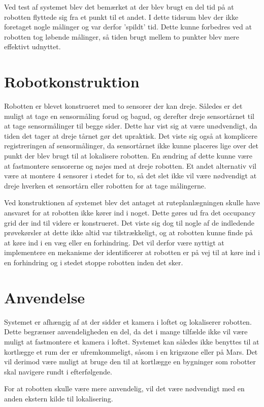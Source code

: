 Ved test af systemet blev det bemærket at der blev brugt en del tid på at robotten flyttede sig fra et punkt til et andet.
I dette tidsrum blev der ikke foretaget nogle målinger og var derfor 'spildt' tid. 
Dette kunne forbedres ved at robotten tog løbende målinger, så tiden brugt mellem to punkter blev mere effektivt udnyttet.

\section{Robotkonstruktion}
Robotten er blevet konstrueret med to sensorer der kan dreje. 
Således er det muligt at tage en sensormåling forud og bagud, og derefter dreje sensortårnet til at tage sensormålinger til begge sider.
Dette har vist sig at være unødvendigt, da tiden det tager at dreje tårnet gør det upraktisk.
Det viste sig også at komplicere registreringen af sensormålinger, da sensortårnet ikke kunne placeres lige over det punkt der blev brugt til at lokalisere robotten.
En ændring af dette kunne være at fastmontere sensorerne og nøjes med at dreje robotten.
Et andet alternativ vil være at montere 4 sensorer i stedet for to, så det slet ikke vil være nødvendigt at dreje hverken et sensortårn eller robotten for at tage målingerne.

Ved konstruktionen af systemet blev det antaget at ruteplanlægningen skulle have ansvaret for at robotten ikke kører ind i noget. 
Dette gøres ud fra det occupancy grid der ind til videre er konstrueret.
Det viste sig dog til nogle af de indledende prøvekørsler at dette ikke altid var tilstrækkeligt, og at robotten kunne finde på at køre ind i en væg eller en forhindring.
Det vil derfor være nyttigt at implementere en mekanisme der identificerer at robotten er på vej til at køre ind i en forhindring og i stedet stoppe robotten inden det sker. 

\section{Anvendelse}
Systemet er afhængig af at der sidder et kamera i loftet og lokaliserer robotten.
Dette begrænser anvendeligheden en del, da det i mange tilfælde ikke vil være muligt at fastmontere et kamera i loftet.
Systemet kan således ikke benyttes til at kortlægge et rum der er ufremkommeligt, såsom i en krigszone eller på Mars.
Det vil derimod være muligt at bruge den til at kortlægge en bygninger som robotter skal navigere rundt i efterfølgende.

For at robotten skulle være mere anvendelig, vil det være nødvendigt med en anden ekstern kilde til lokalisering.